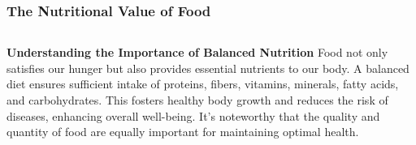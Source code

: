 \documentclass[5pt]{beamer}
\begin{document}
\begin{frame}
\frametitle{The Nutritional Value of Food}
\begin{columns}
\begin{column}{0.7\textwidth}
\begin{block}{\textbf{Understanding the Importance of Balanced Nutrition}}
Food not only satisfies our hunger but also provides essential nutrients to our body. A balanced diet ensures sufficient intake of proteins, fibers, vitamins, minerals, fatty acids, and carbohydrates. This fosters healthy body growth and reduces the risk of diseases, enhancing overall well-being. It's noteworthy that the quality and quantity of food are equally important for maintaining optimal health.
\end{block}
\end{column}
\end{columns}
\end{frame}
\end{document}
